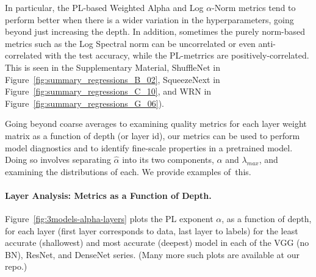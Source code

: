 In particular, the PL-based 
Weighted Alpha and Log $\alpha$-Norm
metrics tend to perform better when there is a wider variation in the hyperparameters, going beyond just increasing the depth.  
In addition, sometimes the purely norm-based metrics such as the Log Spectral norm can be uncorrelated or even anti-correlated with the test accuracy, while the PL-metrrics are positively-correlated.
This is seen in the Supplementary Material, 
ShuffleNet in Figure~\ref{fig:summary_regressions_B_02},
SqueezeNext in Figure~\ref{fig:summary_regressions_C_10}, and 
WRN in Figure~\ref{fig:summary_regressions_G_06}).

Going beyond coarse averages to examining quality metrics for each layer weight matrix as a function of depth (or layer id), our metrics can be used to perform model diagnostics and to identify fine-scale properties in a pretrained model.
Doing so involves separating $\hat{\alpha}$ into its two components, $\alpha$ and $\lambda_{max}$, and examining the distributions of each.
We provide examples of~this.


\paragraph{Layer Analysis: Metrics as a Function of Depth.}

Figure~\ref{fig:3models-alpha-layers} plots the PL exponent $\alpha$, as a function of depth, for each layer (first layer corresponds to data, last layer to labels) for the least accurate (shallowest) and most accurate (deepest) model in each of the VGG (no BN), ResNet, and DenseNet series.
(Many more such plots are available at our repo.)


